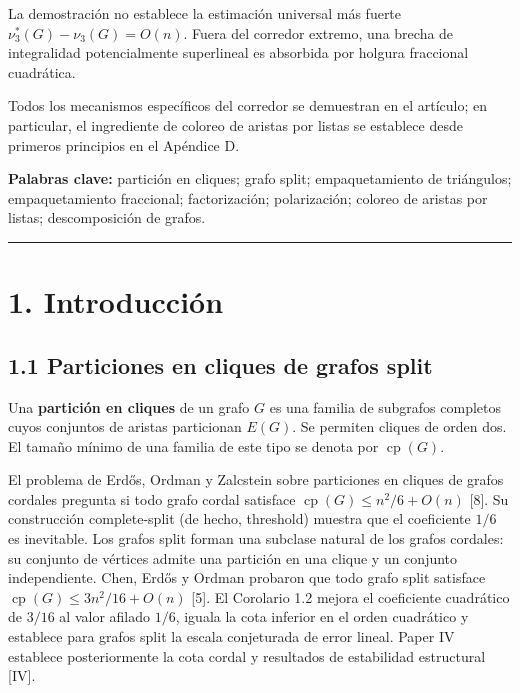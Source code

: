 \documentclass[spanish,11pt,a4paper]{article}
\begin{document}
La demostración no establece la estimación universal más fuerte
\(\nu_3^*(G)-\nu_3(G)=O(n)\). Fuera del corredor extremo, una brecha de
integralidad potencialmente superlineal es absorbida por holgura
fraccional cuadrática.

Todos los mecanismos específicos del corredor se demuestran en el
artículo; en particular, el ingrediente de coloreo de aristas por listas
se establece desde primeros principios en el Apéndice D.

\textbf{Palabras clave:} partición en cliques; grafo split;
empaquetamiento de triángulos; empaquetamiento fraccional;
factorización; polarización; coloreo de aristas por listas;
descomposición de grafos.

\begin{center}\rule{0.5\linewidth}{0.5pt}\end{center}

\section{1. Introducción}\label{introducciuxf3n}

\subsection{1.1 Particiones en cliques de grafos
split}\label{particiones-en-cliques-de-grafos-split}

Una \textbf{partición en cliques} de un grafo \(G\) es una familia de
subgrafos completos cuyos conjuntos de aristas particionan \(E(G)\). Se
permiten cliques de orden dos. El tamaño mínimo de una familia de este
tipo se denota por \(\operatorname{cp}(G)\).

El problema de Erdős, Ordman y Zalcstein sobre particiones en cliques de
grafos cordales pregunta si todo grafo cordal satisface
\(\operatorname{cp}(G)\le n^2/6+O(n)\) {[}8{]}. Su construcción
complete-split (de hecho, threshold) muestra que el coeficiente \(1/6\)
es inevitable. Los grafos split forman una subclase natural de los
grafos cordales: su conjunto de vértices admite una partición en una
clique y un conjunto independiente. Chen, Erdős y Ordman probaron que
todo grafo split satisface \(\operatorname{cp}(G)\le 3n^2/16+O(n)\)
{[}5{]}. El Corolario 1.2 mejora el coeficiente cuadrático de \(3/16\)
al valor afilado \(1/6\), iguala la cota inferior en el orden cuadrático
y establece para grafos split la escala conjeturada de error lineal.
Paper IV establece posteriormente la cota cordal y resultados de
estabilidad estructural {[}IV{]}.
\end{document}
